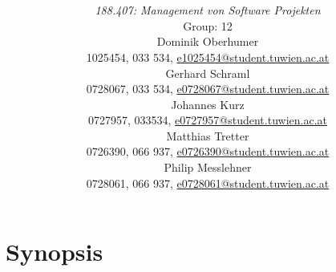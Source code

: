 \documentclass[a4paper,11pt]{article}
\title{\textbf{\sffamily\Huge \ShortTitle}\\ 
{\textbf{\sffamily\Large \FullTitle}}
\vspace{1cm}}
\author{
{\em 188.407: Management von Software Projekten} \vspace{1cm} \\
Group: 12\bigskip \\
Dominik Oberhumer \\ {\small 1025454, 033 534, \href{mailto:e1025454@student.tuwien.ac.at}{e1025454@student.tuwien.ac.at}}\\
Gerhard Schraml \\ {\small 0728067, 033 534, \href{mailto:e0728067@student.tuwien.ac.at}{e0728067@student.tuwien.ac.at}}\\
Johannes Kurz \\ {\small 0727957, 033534, \href{mailto:e0727957@student.tuwien.ac.at}{e0727957@student.tuwien.ac.at}}\\
Matthias Tretter \\ {\small 0726390, 066 937,  \href{mailto:e0726390@student.tuwien.ac.at}{e0726390@student.tuwien.ac.at}}\\
Philip Messlehner \\ {\small 0728061, 066 937, \href{mailto:e0728061@student.tuwien.ac.at}{e0728061@student.tuwien.ac.at}}\\

\vspace{4cm}
}
\providecommand*{\note}[1]{\small \textcolor{RoyalBlue}{\begin{minipage}{\textwidth}{#1}\end{minipage}}}
\begin{document}
\begin{titlepage}
\maketitle

\end{titlepage}


\thispagestyle{empty}
\tableofcontents
\pagebreak

\setcounter{page}{1}




\section{Synopsis}
\label{sect:synopsis}
\end{document}
